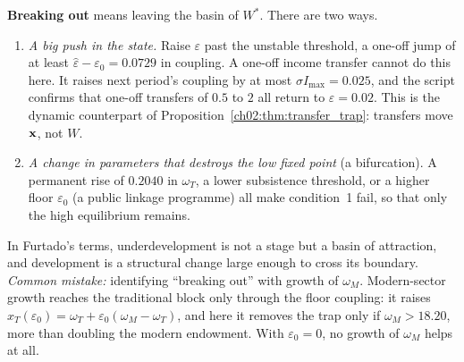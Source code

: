 \documentclass[../solutions_manual.tex]{subfiles}
\begin{document}
 \textbf{Breaking out} means leaving the basin of $W^*$. There are two ways.
\begin{enumerate}
\item \emph{A big push in the state.} Raise $\varepsilon$ past the unstable threshold, a one-off jump of at least $\hat\varepsilon - \varepsilon_0 = 0.0729$ in coupling. A one-off income transfer cannot do this here. It raises next period's coupling by at most $\sigma I_{\max} = 0.025$, and the script confirms that one-off transfers of $0.5$ to $2$ all return to $\varepsilon = 0.02$. This is the dynamic counterpart of Proposition~\ref{ch02:thm:transfer_trap}: transfers move $\mathbf{x}$, not $W$.
\item \emph{A change in parameters that destroys the low fixed point} (a bifurcation). A permanent rise of $0.2040$ in $\omega_T$, a lower subsistence threshold, or a higher floor $\varepsilon_0$ (a public linkage programme) all make condition~1 fail, so that only the high equilibrium remains.
\end{enumerate}
In Furtado's terms, underdevelopment is not a stage but a basin of attraction, and development is a structural change large enough to cross its boundary. \emph{Common mistake:} identifying ``breaking out'' with growth of $\omega_M$. Modern-sector growth reaches the traditional block only through the floor coupling: it raises $x_T(\varepsilon_0) = \omega_T + \varepsilon_0(\omega_M - \omega_T)$, and here it removes the trap only if $\omega_M > 18.20$, more than doubling the modern endowment. With $\varepsilon_0 = 0$, no growth of $\omega_M$ helps at all.
\end{document}
